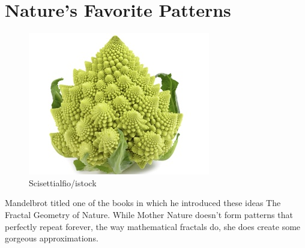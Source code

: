 \documentclass{article}
\begin{document}
\section{Nature's Favorite Patterns}
\begin{figure}[H]
\centering
\includegraphics[scale=1]{DSC-B0817_07.jpg}
\caption{Scisettialfio/istock}
\end{figure}
Mandelbrot titled one of the books in which he introduced these ideas The Fractal Geometry of Nature. While Mother Nature doesn’t form patterns that perfectly repeat forever, the way mathematical fractals do, she does create some gorgeous approximations.
\end{document}
